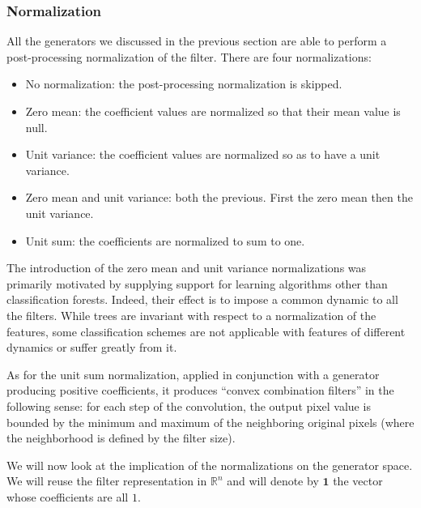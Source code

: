 \documentclass[a4paper]{report}
\begin{document}
			
			\subsubsection{Normalization}
			All the generators we discussed in the previous section are able to perform a post-processing normalization of the filter. There are four normalizations:
			
			\begin{itemize}
				\item No normalization: the post-processing normalization is skipped.
				\item Zero mean: the coefficient values are normalized so that their mean value is null.
				\item Unit variance: the coefficient values are normalized so as to have a unit variance.
				\item Zero mean and unit variance: both the previous. First the zero mean then the unit variance.
				\item Unit sum: the coefficients are normalized to sum to one.
			\end{itemize}
			
			The introduction of the zero mean and unit variance normalizations was primarily motivated by supplying support for learning algorithms other than classification forests. Indeed, their effect is to impose a common dynamic to all the filters. While trees are invariant with respect to a normalization of the features, some classification schemes are not applicable with features of different dynamics or suffer greatly from it.
			\par
			As for the unit sum normalization, applied in conjunction with a generator producing positive coefficients, it produces ``convex combination filters'' in the following sense: for each step of the convolution, the output pixel value is bounded by the minimum and maximum of the neighboring original pixels (where the neighborhood is defined by the filter size).
			\par
			We will now look at the implication of the normalizations on the generator space. We will reuse the filter representation in $\mathbb{R}^n$ and will denote by $\textbf{1}$ the vector whose coefficients are all $1$.
			
\end{document}
